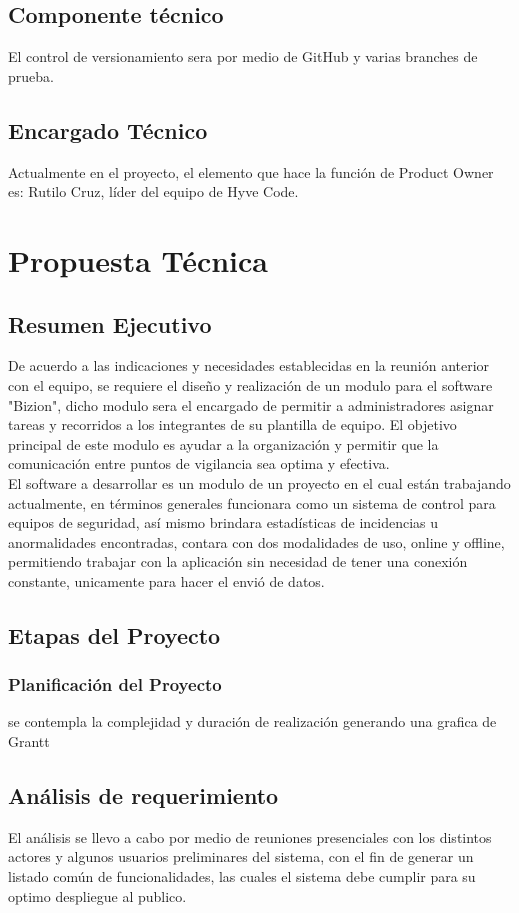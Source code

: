 \documentclass{report}
\begin{document}
		\section{Componente técnico}
			El control de versionamiento sera por medio de GitHub y varias branches de prueba.
		\section{Encargado Técnico}
			Actualmente en el proyecto, el elemento que hace la función de Product Owner es: Rutilo Cruz, líder del equipo de Hyve Code.
	
	\chapter{Propuesta Técnica}
		\section{Resumen Ejecutivo}
		De acuerdo a las indicaciones y necesidades establecidas en la reunión anterior con el equipo, se requiere el diseño y realización de un modulo para el software "Bizion", dicho modulo sera el encargado de permitir a administradores asignar tareas y recorridos a los integrantes de su plantilla de equipo. El objetivo principal de este modulo es ayudar a la organización y permitir que la comunicación entre puntos de vigilancia sea optima y efectiva. \\
		
		El software a desarrollar es un modulo de un proyecto en el cual están trabajando actualmente, en términos generales funcionara como un sistema de control para equipos de seguridad, así mismo brindara estadísticas de incidencias u anormalidades encontradas, contara con dos modalidades de uso, online y offline, permitiendo trabajar con la aplicación sin necesidad de tener una conexión constante, unicamente para hacer el envió de datos.
	
		
		\section{Etapas del Proyecto}
			\subsection{Planificación del Proyecto}
					se contempla la complejidad y duración de realización generando una grafica de Grantt 
					\newpage
		\section{Análisis de requerimiento}
				El análisis se llevo a cabo por medio de reuniones presenciales con los distintos actores y algunos usuarios preliminares del sistema, con el fin de generar un listado común de funcionalidades, las cuales el sistema debe cumplir para su optimo despliegue al publico.
\end{document}
